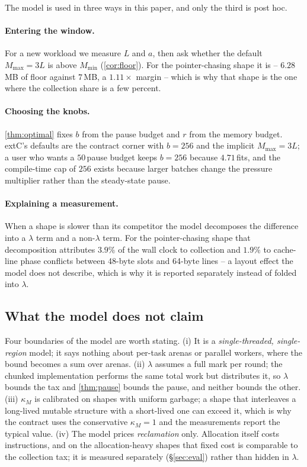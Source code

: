 The model is used in three ways in this paper, and only the third is post hoc.

\paragraph{Entering the window.}
For a new workload we measure $L$ and $a$, then ask whether the default $M_{\max} = 3L$ is above
$M_{\min}$ (\cor\ref{cor:floor}).
For the pointer-chasing shape it is -- $6.28$\,MB of floor against $7$\,MB, a $1.11\times$ margin --
which is why that shape is the one where the collection share is a few percent.

\paragraph{Choosing the knobs.}
\thm\ref{thm:optimal} fixes $b$ from the pause budget and $r$ from the memory budget.
extC's defaults are the contract corner with $b = 256$ and the implicit $M_{\max} = 3L$; a user who
wants a $50$\,\us pause budget keeps $b = 256$ because $4.71$\,\us fits, and the compile-time cap of
$256$ exists because larger batches change the pressure multiplier rather than the steady-state
pause.

\paragraph{Explaining a measurement.}
When a shape is slower than its competitor the model decomposes the difference into a $\lambda$ term
and a non-$\lambda$ term.
For the pointer-chasing shape that decomposition attributes $3.9\%$ of the wall clock to collection
and $1.9\%$ to cache-line phase conflicts between 48-byte slots and 64-byte lines -- a layout effect
the model does not describe, which is why it is reported separately instead of folded into
$\lambda$.

\subsection{What the model does not claim}
\label{sec:roofline-limits}

Four boundaries of the model are worth stating.
(i) It is a \emph{single-threaded, single-region} model; it says nothing about per-task arenas or
parallel workers, where the bound becomes a sum over arenas.
(ii) $\lambda$ assumes a full mark per round; the chunked implementation performs the same total work
but distributes it, so $\lambda$ bounds the tax and \thm\ref{thm:pause} bounds the pause, and neither
bounds the other.
(iii) $\kappa_M$ is calibrated on shapes with uniform garbage; a shape that interleaves a long-lived
mutable structure with a short-lived one can exceed it, which is why the contract uses the
conservative $\kappa_M = 1$ and the measurements report the typical value.
(iv) The model prices \emph{reclamation} only.
Allocation itself costs instructions, and on the allocation-heavy shapes that fixed cost is
comparable to the collection tax; it is measured separately (\S\ref{sec:eval}) rather than hidden in
$\lambda$.